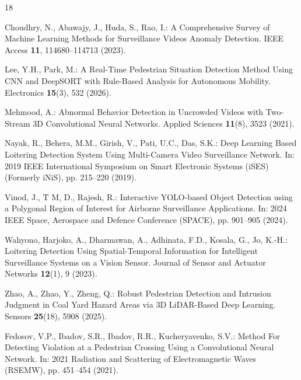 \documentclass[runningheads]{llncs}
\begin{document}
%
%
%
% 
% 
%
\begin{thebibliography}{18}

Choudhry, N., Abawajy, J., Huda, S., Rao, I.: A Comprehensive Survey of Machine Learning Methods for Surveillance Videos Anomaly Detection. IEEE Access \textbf{11}, 114680--114713 (2023). 

Lee, Y.H., Park, M.: A Real-Time Pedestrian Situation Detection Method Using CNN and DeepSORT with Rule-Based Analysis for Autonomous Mobility. Electronics \textbf{15}(3), 532 (2026). 

Mehmood, A.: Abnormal Behavior Detection in Uncrowded Videos with Two-Stream 3D Convolutional Neural Networks. Applied Sciences \textbf{11}(8), 3523 (2021). 

Nayak, R., Behera, M.M., Girish, V., Pati, U.C., Das, S.K.: Deep Learning Based Loitering Detection System Using Multi-Camera Video Surveillance Network. In: 2019 IEEE International Symposium on Smart Electronic Systems (iSES) (Formerly iNiS), pp. 215--220 (2019). 

Vinod, J., T M, D., Rajesh, R.: Interactive YOLO-based Object Detection using a Polygonal Region of Interest for Airborne Surveillance Applications. In: 2024 IEEE Space, Aerospace and Defence Conference (SPACE), pp. 901--905 (2024). 

Wahyono, Harjoko, A., Dharmawan, A., Adhinata, F.D., Kosala, G., Jo, K.-H.: Loitering Detection Using Spatial-Temporal Information for Intelligent Surveillance Systems on a Vision Sensor. Journal of Sensor and Actuator Networks \textbf{12}(1), 9 (2023). 

Zhao, A., Zhao, Y., Zheng, Q.: Robust Pedestrian Detection and Intrusion Judgment in Coal Yard Hazard Areas via 3D LiDAR-Based Deep Learning. Sensors \textbf{25}(18), 5908 (2025). 

Fedosov, V.P., Ibadov, S.R., Ibadov, R.R., Kucheryavenko, S.V.: Method For Detecting Violation at a Pedestrian Crossing Using a Convolutional Neural Network. In: 2021 Radiation and Scattering of Electromagnetic Waves (RSEMW), pp. 451--454 (2021). 


\end{thebibliography}
\end{document}
